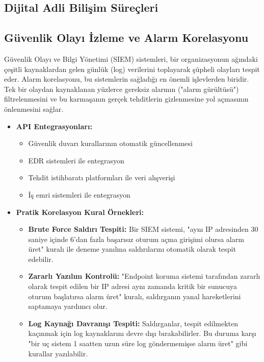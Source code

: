 \begin{itemize}
\begin{itemize}
\section{Dijital Adli Bilişim Süreçleri}

\subsection{Güvenlik Olayı İzleme ve Alarm Korelasyonu}

Güvenlik Olayı ve Bilgi Yönetimi (SIEM) sistemleri, bir organizasyonun ağındaki çeşitli kaynaklardan gelen günlük (log) verilerini toplayarak şüpheli olayları tespit eder. Alarm korelasyonu, bu sistemlerin sağladığı en önemli işlevlerden biridir. Tek bir olaydan kaynaklanan yüzlerce gereksiz alarmın ("alarm gürültüsü") filtrelenmesini ve bu karmaşanın gerçek tehditlerin gizlenmesine yol açmasının önlenmesini sağlar.

\begin{itemize}
    \item \textbf{API Entegrasyonları:}
    \begin{itemize}
        \item Güvenlik duvarı kurallarının otomatik güncellenmesi
        \item EDR sistemleri ile entegrasyon
        \item Tehdit istihbaratı platformları ile veri alışverişi
        \item İş emri sistemleri ile entegrasyon
    \end{itemize}
    
    \item \textbf{Pratik Korelasyon Kural Örnekleri:}
    \begin{itemize}
        \item \textbf{Brute Force Saldırı Tespiti:} Bir SIEM sistemi, "aynı IP adresinden 30 saniye içinde 6'dan fazla başarısız oturum açma girişimi olursa alarm üret" kuralı ile deneme yanılma saldırılarını otomatik olarak tespit edebilir.
        \item \textbf{Zararlı Yazılım Kontrolü:} "Endpoint koruma sistemi tarafından zararlı olarak tespit edilen bir IP adresi aynı zamanda kritik bir sunucuya oturum başlatırsa alarm üret" kuralı, saldırganın yanal hareketlerini saptamaya yardımcı olur.
        \item \textbf{Log Kaynağı Davranışı Tespiti:} Saldırganlar, tespit edilmekten kaçınmak için log kaynaklarını devre dışı bırakabilirler. Bu duruma karşı "bir uç sistem 1 saatten uzun süre log göndermemişse alarm üret" gibi kurallar yazılabilir.
    \end{itemize}
\end{itemize}


\end{itemize}
\end{itemize}
